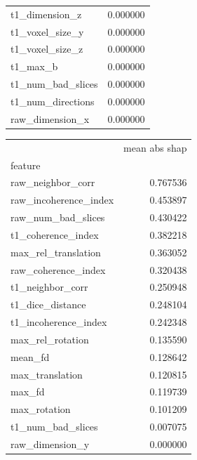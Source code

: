 \documentclass[fleqn,10pt,inline]{wlscirep}
\begin{document}
\begin{table}[tbp]
\begin{multicols}{2}
\begin{tabular}{lr}
t1\_dimension\_z        &                  0.000000 \\
t1\_voxel\_size\_y       &                  0.000000 \\
t1\_voxel\_size\_z       &                  0.000000 \\
t1\_max\_b              &                  0.000000 \\
t1\_num\_bad\_slices     &                  0.000000 \\
t1\_num\_directions     &                  0.000000 \\
raw\_dimension\_x       &                  0.000000 \\
\bottomrule
\end{tabular}

{\nolinenumbers
\begin{tabular}{lr}
\toprule
{} &  mean abs shap \\
feature               &                           \\
\midrule
raw\_neighbor\_corr     &                  0.767536 \\
raw\_incoherence\_index &                  0.453897 \\
raw\_num\_bad\_slices    &                  0.430422 \\
t1\_coherence\_index    &                  0.382218 \\
max\_rel\_translation   &                  0.363052 \\
raw\_coherence\_index   &                  0.320438 \\
t1\_neighbor\_corr      &                  0.250948 \\
t1\_dice\_distance      &                  0.248104 \\
t1\_incoherence\_index  &                  0.242348 \\
max\_rel\_rotation      &                  0.135590 \\
mean\_fd               &                  0.128642 \\
max\_translation       &                  0.120815 \\
max\_fd                &                  0.119739 \\
max\_rotation          &                  0.101209 \\
t1\_num\_bad\_slices     &                  0.007075 \\
raw\_dimension\_y       &                  0.000000 \\

\end{tabular}}
\end{multicols}
\end{table}
\end{document}
